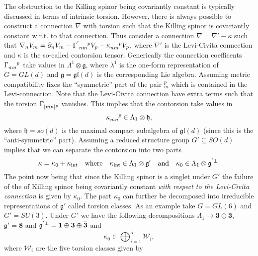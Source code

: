 The obstruction to the Killing spinor being covariantly constant is typically discussed in terms of intrinsic torsion. However, there is always possible to construct a connection $\nabla$ with torsion such that the Killing spinor is covariantly constant w.r.t. to that connection. Thus consider a connection $\nabla=\nabla'-\kappa$ such that $\nabla_n V_m=\pd_nV_m-\tensor{\Gamma}{^'_{nm}^p}V_p-\tensor{\kappa}{_{nm}^p}V_p$, where $\nabla'$ is the Levi-Civita connection and $\kappa$ is the so-called contorsion tensor. Generically the connection coefficents $\tensor{\Gamma}{_{mn}^p}$ take values in $\Lambda^1\otimes\mathfrak{g}$, where $\lambda^1$ is the one-form representation of $G=GL(d)$ and $\mathfrak{g}=\mathfrak{gl}(d)$ is the corresponding Lie algebra. Assuming metric compatibility fixes the ``symmetric'' part of the pair $_m^p$ which is contained in the Levi-connection. Note that the Levi-Civita connection have extra terms such that the torsion $\tensor{\Gamma}{_{[mn]^p}}$ vanishes. This implies that the contorsion take values in 
\begin{equation}
    \tensor{\kappa}{_{mn}^p}\in \Lambda_1\otimes \mathfrak{h},
\end{equation}
where $\mathfrak{h}=so(d)$ is the maximal compact subalgebra of $\mathfrak{gl}(d)$ (since this is the ``anti-symmetric'' part). Assuming a reduced structure group $G'\subseteq SO(d)$ implies that we can separate the contorsion into two parts 
\begin{equation}
    \kappa = \kappa_0+\kappa_{\text{int}}\quad \text{where} \quad \kappa_{\text{int}}\in \Lambda_1\otimes \mathfrak{g}'\quad \text{and}\quad \kappa_{0}\in \Lambda_1\otimes \tensor{\mathfrak{g}}{^'^{\perp}}.
\end{equation}
The point now being that since the Killing spinor is a singlet under $G'$ the failure of the of Killing spinor being covariantly constant \emph{with respect to the Levi-Civita connection} is given by $\kappa_0$. The part $\kappa_0$ can further be decomposed into irreducible representations of $\mathfrak{g}'$ called torsion classes. As an example take $G=GL(6)$ and $G'=SU(3)$. Under $G'$ we have the following decompositions $\Lambda_1\to \mathbf{3}\oplus\overbar{\mathbf{3}}$, $\mathfrak{g}'=\mathbf{8}$ and $\tensor{\mathfrak{g}}{^'^{\perp}}=\mathbf{1}\oplus\mathbf{3}\oplus\overbar{\mathbf{3}}$ and 
\begin{equation}
    \kappa_0 \in \bigoplus_{i=1}^5 \mathscr{W}_i,
\end{equation}
where $\mathscr{W}_i$ are the five torsion classes given by 
